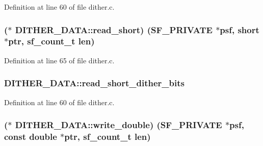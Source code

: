 Definition at line 60 of file dither.\+c.

\subsubsection[{\texorpdfstring{read\+\_\+short}{read_short}}]{($\ast$ D\+I\+T\+H\+E\+R\+\_\+\+D\+A\+T\+A\+::read\+\_\+short) ({\bf S\+F\+\_\+\+P\+R\+I\+V\+A\+TE} $\ast$psf, short $\ast$ptr, {\bf sf\+\_\+count\+\_\+t} {\bf len})}\hypertarget{struct_d_i_t_h_e_r___d_a_t_a_a5f3dbc8a45b2b9fd16ec17e777f32673}{}\label{struct_d_i_t_h_e_r___d_a_t_a_a5f3dbc8a45b2b9fd16ec17e777f32673}


Definition at line 65 of file dither.\+c.

\subsubsection[{\texorpdfstring{read\+\_\+short\+\_\+dither\+\_\+bits}{read_short_dither_bits}}]{ D\+I\+T\+H\+E\+R\+\_\+\+D\+A\+T\+A\+::read\+\_\+short\+\_\+dither\+\_\+bits}\hypertarget{struct_d_i_t_h_e_r___d_a_t_a_a414acde8e946e606c86ab1eafaa9fa11}{}\label{struct_d_i_t_h_e_r___d_a_t_a_a414acde8e946e606c86ab1eafaa9fa11}


Definition at line 60 of file dither.\+c.

\subsubsection[{\texorpdfstring{write\+\_\+double}{write_double}}]{($\ast$ D\+I\+T\+H\+E\+R\+\_\+\+D\+A\+T\+A\+::write\+\_\+double) ({\bf S\+F\+\_\+\+P\+R\+I\+V\+A\+TE} $\ast$psf, {\bf const} double $\ast$ptr, {\bf sf\+\_\+count\+\_\+t} {\bf len})}\hypertarget{struct_d_i_t_h_e_r___d_a_t_a_a08f4563c3c7c6c0ec51c3de872e451f3}{}\label{struct_d_i_t_h_e_r___d_a_t_a_a08f4563c3c7c6c0ec51c3de872e451f3}


